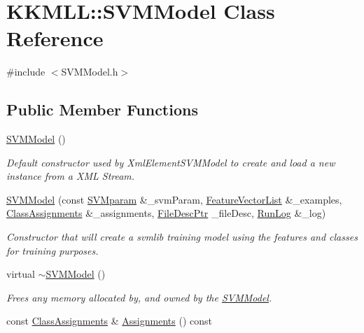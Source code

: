 \hypertarget{class_k_k_m_l_l_1_1_s_v_m_model}{}\section{K\+K\+M\+LL\+:\+:S\+V\+M\+Model Class Reference}
\label{class_k_k_m_l_l_1_1_s_v_m_model}


{\ttfamily \#include $<$S\+V\+M\+Model.\+h$>$}

\subsection*{Public Member Functions}
\begin{DoxyCompactItemize}
\item 
\hyperlink{class_k_k_m_l_l_1_1_s_v_m_model_ac71a4eca05bef68550eb076582bc90d5}{S\+V\+M\+Model} ()
\begin{DoxyCompactList}\small\item\em Default constructor used by Xml\+Element\+S\+V\+M\+Model to create and load a new instance from a X\+ML Stream. \end{DoxyCompactList}\item 
\hyperlink{class_k_k_m_l_l_1_1_s_v_m_model_ab4e84a636f341cbd5eff5b0e9f2cf978}{S\+V\+M\+Model} (const \hyperlink{class_k_k_m_l_l_1_1_s_v_mparam}{S\+V\+Mparam} \&\+\_\+svm\+Param, \hyperlink{class_k_k_m_l_l_1_1_feature_vector_list}{Feature\+Vector\+List} \&\+\_\+examples, \hyperlink{class_k_k_m_l_l_1_1_class_assignments}{Class\+Assignments} \&\+\_\+assignments, \hyperlink{namespace_k_k_m_l_l_aa0d0b6ab4ec18868a399b8455b05d914}{File\+Desc\+Ptr} \+\_\+file\+Desc, \hyperlink{class_k_k_b_1_1_run_log}{Run\+Log} \&\+\_\+log)
\begin{DoxyCompactList}\small\item\em Constructor that will create a svmlib training model using the features and classes for training purposes. \end{DoxyCompactList}\item 
virtual \hyperlink{class_k_k_m_l_l_1_1_s_v_m_model_a70200454d42cc51adbb521f39c6ef0cd}{$\sim$\+S\+V\+M\+Model} ()
\begin{DoxyCompactList}\small\item\em Frees any memory allocated by, and owned by the \hyperlink{class_k_k_m_l_l_1_1_s_v_m_model}{S\+V\+M\+Model}. \end{DoxyCompactList}\item 
const \hyperlink{class_k_k_m_l_l_1_1_class_assignments}{Class\+Assignments} \& \hyperlink{class_k_k_m_l_l_1_1_s_v_m_model_ad506eb7f86db4ac26da0f57277bde407}{Assignments} () const 

\end{DoxyCompactItemize}
